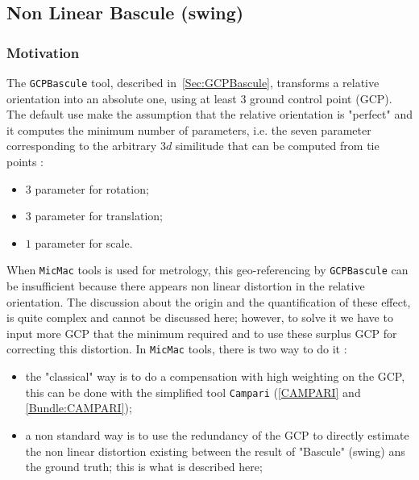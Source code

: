 
\subsection{Non Linear Bascule (swing)}

\subsubsection{Motivation}

\label{NonLin:GCPBascule}

The {\tt GCPBascule} tool, described in~\ref{Sec:GCPBascule}, transforms a relative orientation
into an absolute one, using at least $3$ ground control point (GCP). The default use make
the assumption that the relative orientation is "perfect" and it computes the minimum number
of parameters, i.e. the seven parameter corresponding to the arbitrary $3d$ similitude
 that can be computed from tie points :

\begin{itemize}
   \item $3$ parameter for rotation;
   \item $3$ parameter for translation;
   \item $1$ parameter for scale.
\end{itemize}


When {\tt MicMac} tools is used for metrology, this geo-referencing by {\tt GCPBascule}
can be insufficient because there appears non linear distortion in the relative orientation. The discussion about the
origin and the quantification of these effect,  is quite complex and cannot be discussed here;
however,  to solve it we have to input more GCP that the minimum required and to use these
surplus GCP for correcting this distortion. In {\tt MicMac} tools, there is two way to do it :


\begin{itemize}
   \item the "classical" way is to do a compensation with high weighting on the GCP, this can be done
        with the simplified tool   {\tt Campari}  (\ref{CAMPARI} and \ref{Bundle:CAMPARI});

   \item a non standard way is to use the redundancy of the GCP to directly estimate the non linear distortion
        existing between the result of "Bascule" (swing) ans the ground truth; this is what is described here;

\end{itemize}

